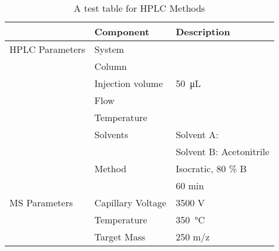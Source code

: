 \begin{table}[h]
	\caption{A test table for HPLC Methods}
	\label{tab:asddf}
	\centering
	\begin{tabularx}{\textwidth}{XXX}
						& \textbf{Component}		& \textbf{Description}	\\
		\midrule
		HPLC Parameters & System			& 	\\
						& Column			& 	\\
						& Injection volume 	& \SI{50}{\micro\liter}	\\
						& Flow				& 	\\
						& Temperature		& 	\\
						& Solvents			& Solvent A: \ch{H2O}	\\
						& 					& Solvent B: Acetonitrile	\\
						& Method			& Isocratic, 80 \% B \\
						&					& 60 min \\
		MS Parameters	& Capillary Voltage	& 3500 V\\
						& Temperature		& \SI{350}{\celsius}	\\
						& Target Mass		& 250 m/z \\
		\bottomrule
	\end{tabularx}
\end{table}

